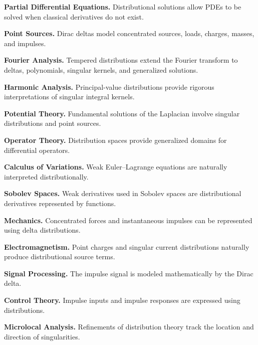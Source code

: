 \begin{applicationbox}
\textbf{Partial Differential Equations.}
Distributional solutions allow PDEs to be solved when classical
derivatives do not exist.

\medskip

\textbf{Point Sources.}
Dirac deltas model concentrated sources, loads, charges, masses, and
impulses.

\medskip

\textbf{Fourier Analysis.}
Tempered distributions extend the Fourier transform to deltas,
polynomials, singular kernels, and generalized solutions.

\medskip

\textbf{Harmonic Analysis.}
Principal-value distributions provide rigorous interpretations of
singular integral kernels.

\medskip

\textbf{Potential Theory.}
Fundamental solutions of the Laplacian involve singular distributions and
point sources.

\medskip

\textbf{Operator Theory.}
Distribution spaces provide generalized domains for differential
operators.

\medskip

\textbf{Calculus of Variations.}
Weak Euler--Lagrange equations are naturally interpreted
distributionally.

\medskip

\textbf{Sobolev Spaces.}
Weak derivatives used in Sobolev spaces are distributional derivatives
represented by functions.

\medskip

\textbf{Mechanics.}
Concentrated forces and instantaneous impulses can be represented using
delta distributions.

\medskip

\textbf{Electromagnetism.}
Point charges and singular current distributions naturally produce
distributional source terms.

\medskip

\textbf{Signal Processing.}
The impulse signal is modeled mathematically by the Dirac delta.

\medskip

\textbf{Control Theory.}
Impulse inputs and impulse responses are expressed using distributions.

\medskip

\textbf{Microlocal Analysis.}
Refinements of distribution theory track the location and direction of
singularities.
\end{applicationbox}

